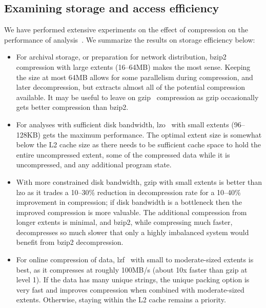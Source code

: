 \documentclass{acm_proc_article-sp}
\begin{document}
\subsection{Examining storage and access efficiency}\label{sec:efficiency}

We have performed extensive experiments on the effect 
of compression
on the performance of analysis~\cite{DSTechnicalReportSnapshot}.  We
summarize the results on storage efficiency below:

\begin{itemize}

\item For archival storage, or preparation for network distribution,
bzip2~\cite{BZIP} compression with large extents (16--64MB) makes the
most sense.  Keeping the size at most 64MB allows for some parallelism
during compression, and later decompression, but extracts almost all
of the potential compression available.  It may be useful to leave on
gzip~\cite{GZIP} compression 
as gzip occasionally gets better compression than
bzip2.

\item For analyses with sufficient disk bandwidth, lzo~\cite{LZO} with
small extents (96--128KB) gets the maximum performance.  The optimal
extent size is somewhat below the L2 cache size as there needs to be
sufficient cache space to hold the entire uncompressed extent, some of
the compressed data while it is uncompressed, and any additional
program state.

\item With more constrained disk bandwidth, gzip
with
small extents is better than lzo as it trades a 10--30\% reduction in
decompression rate for a 10--40\% improvement in compression; if disk
bandwidth is a 
bottleneck then the improved compression is more valuable.
The additional compression from longer extents is minimal, and bzip2,
while compressing much faster, decompresses so much slower that only a
highly imbalanced system would benefit from bzip2 decompression.

\item For online compression of data, lzf~\cite{LZF} with small to
moderate-sized extents is 
best, as it compresses at roughly 100MB/s (about 10x
faster than gzip at level 1).
If the data has many unique strings, the unique packing option
is very fast and improves compression when combined with 
moderate-sized extents.
Otherwise, staying within the L2 cache remains a priority.
\end{itemize}
\end{document}
